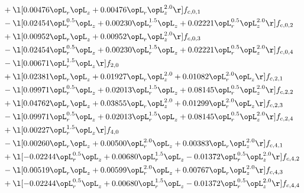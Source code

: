 \begin{alignat}{2}
& + \l[  0.00476 \opL_r \opL_z +  0.00476 \opL_r \opL_z^{2.0}  \r] f_{c,0,1} \nonumber \\ 
& - \l[  0.02454 \opL_r^{0.5} \opL_z +  0.00230 \opL_r^{1.5} \opL_z +  0.02221 \opL_r^{0.5} \opL_z^{2.0}  \r] f_{c,0,2} \nonumber \\ 
& + \l[  0.00952 \opL_r \opL_z +  0.00952 \opL_r \opL_z^{2.0}  \r] f_{c,0,3} \nonumber \\ 
& - \l[  0.02454 \opL_r^{0.5} \opL_z +  0.00230 \opL_r^{1.5} \opL_z +  0.02221 \opL_r^{0.5} \opL_z^{2.0}  \r] f_{c,0,4} \nonumber \\ 
& - \l[  0.00671 \opL_r^{1.5} \opL_z  \r] f_{2,0} \nonumber \\ 
& + \l[  0.02381 \opL_r \opL_z +  0.01927 \opL_r \opL_z^{2.0} +  0.01082 \opL_r^{2.0} \opL_z  \r] f_{c,2,1} \nonumber \\ 
& - \l[  0.09971 \opL_r^{0.5} \opL_z +  0.02013 \opL_r^{1.5} \opL_z +  0.08145 \opL_r^{0.5} \opL_z^{2.0}  \r] f_{c,2,2} \nonumber \\ 
& + \l[  0.04762 \opL_r \opL_z +  0.03855 \opL_r \opL_z^{2.0} +  0.01299 \opL_r^{2.0} \opL_z  \r] f_{c,2,3} \nonumber \\ 
& - \l[  0.09971 \opL_r^{0.5} \opL_z +  0.02013 \opL_r^{1.5} \opL_z +  0.08145 \opL_r^{0.5} \opL_z^{2.0}  \r] f_{c,2,4} \nonumber \\ 
& + \l[  0.00227 \opL_r^{1.5} \opL_z  \r] f_{4,0} \nonumber \\ 
& - \l[  0.00260 \opL_r \opL_z +  0.00500 \opL_r^{2.0} \opL_z +  0.00383 \opL_r \opL_z^{2.0}  \r] f_{c,4,1} \nonumber \\ 
& + \l[  -0.02244 \opL_r^{0.5} \opL_z +  0.00680 \opL_r^{1.5} \opL_z   -0.01372 \opL_r^{0.5} \opL_z^{2.0}  \r] f_{c,4,2} \nonumber \\ 
& - \l[  0.00519 \opL_r \opL_z +  0.00599 \opL_r^{2.0} \opL_z +  0.00767 \opL_r \opL_z^{2.0}  \r] f_{c,4,3} \nonumber \\ 
& + \l[  -0.02244 \opL_r^{0.5} \opL_z +  0.00680 \opL_r^{1.5} \opL_z   -0.01372 \opL_r^{0.5} \opL_z^{2.0}  \r] f_{c,4,4} \nonumber \\ 
\end{alignat} 


